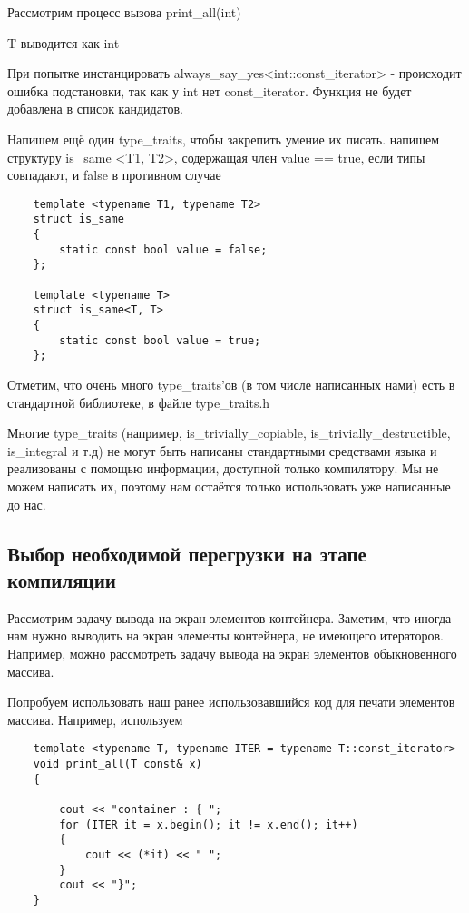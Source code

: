 	Рассмотрим процесс вызова print\_all(int)
	
	T выводится как int
	
	При попытке инстанцировать always\_say\_yes<int::const\_iterator> - происходит ошибка подстановки, так как у int нет const\_iterator. Функция не будет добавлена в список кандидатов.

	\vspace{\baselineskip}
	
	Напишем ещё один type\_traits, чтобы закрепить умение их писать. напишем структуру is\_same <T1, T2>, содержащая член value == true, если типы совпадают, и false в противном случае

	\begin{verbatim}
	template <typename T1, typename T2>
	struct is_same
	{
	    static const bool value = false;
	};
 
	template <typename T>
	struct is_same<T, T>
	{
	    static const bool value = true;
	};
	\end{verbatim}
	
	Отметим, что очень много type\_traits’ов (в том числе написанных нами) есть в стандартной библиотеке, в файле type\_traits.h

	Многие type\_traits (например, is\_trivially\_copiable, is\_trivially\_destructible, is\_integral и т.д) не могут быть написаны стандартными средствами языка и реализованы с помощью информации, доступной только компилятору. Мы не можем написать их, поэтому нам остаётся только использовать уже написанные до нас.
	
	\subsection{Выбор необходимой перегрузки на этапе компиляции}
	
	Рассмотрим задачу вывода на экран элементов контейнера. Заметим, что иногда нам нужно выводить на экран элементы контейнера, не имеющего итераторов. Например, можно рассмотреть задачу вывода на экран элементов обыкновенного массива.
	
	Попробуем использовать наш ранее использовавшийся код для печати элементов массива. Например, используем

	\begin{verbatim}
	template <typename T, typename ITER = typename T::const_iterator>
	void print_all(T const& x)
	{

	    cout << "container : { ";
	    for (ITER it = x.begin(); it != x.end(); it++)
	    {
	        cout << (*it) << " ";
	    } 
	    cout << "}";
	}
	\end{verbatim}

